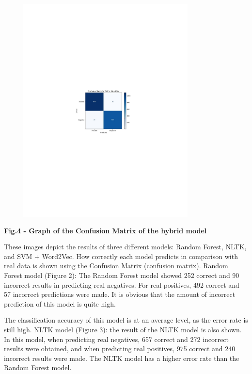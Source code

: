\begin{figure}[H]
	\centering
	\includegraphics[width=0.8\textwidth]{media/ict/image25}
	\caption*{}
\end{figure}


{\bfseries Fig.4 - Graph of the Confusion Matrix of the hybrid model}

These images depict the results of three different models: Random
Forest, NLTK, and SVM + Word2Vec. How correctly each model predicts in
comparison with real data is shown using the Confusion Matrix (confusion
matrix). Random Forest model (Figure 2): The Random Forest model showed
252 correct and 90 incorrect results in predicting real negatives. For
real positives, 492 correct and 57 incorrect predictions were made. It
is obvious that the amount of incorrect prediction of this model is
quite high.

The classification accuracy of this model is at an average level, as the
error rate is still high. NLTK model (Figure 3): the result of the NLTK
model is also shown. In this model, when predicting real negatives, 657
correct and 272 incorrect results were obtained, and when predicting
real positives, 975 correct and 240 incorrect results were made. The
NLTK model has a higher error rate than the Random Forest model.

